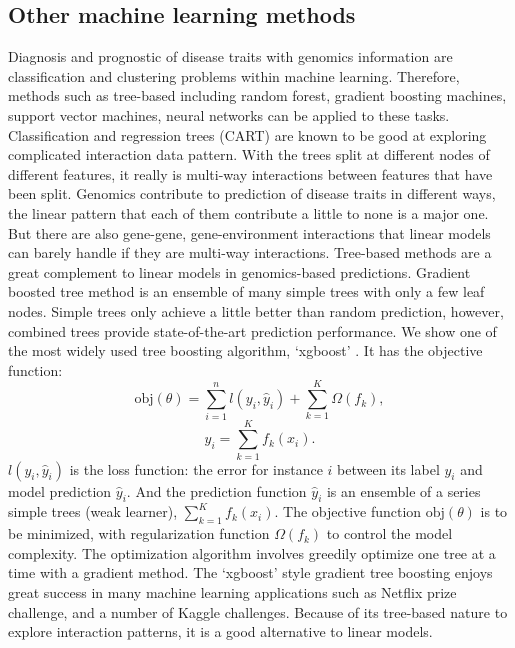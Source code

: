 \subsection{Other machine learning methods}
\label{sec:tree}
Diagnosis and prognostic of disease traits with genomics information are classification and clustering problems within machine learning. Therefore, methods such as tree-based including random forest, gradient boosting machines, support vector machines, neural networks can be applied to these tasks. Classification and regression trees (CART) are known to be good at exploring complicated interaction data pattern. With the trees split at different nodes of different features, it really is multi-way interactions between features that have been split. Genomics contribute to prediction of disease traits in different ways, the linear pattern that each of them contribute a little to none is a major one. But there are also gene-gene, gene-environment interactions that linear models can barely handle if they are multi-way interactions. Tree-based methods are a great complement to linear models in genomics-based predictions. Gradient boosted tree method is an ensemble of many simple trees with only a few leaf nodes. Simple trees only achieve a little better than random prediction, however, combined trees provide state-of-the-art prediction performance. We show one of the most widely used tree boosting algorithm, `xgboost' \citep{chen2016xgboost}. It has the objective function:
\begin{displaymath}
\text{obj}(\theta) = \sum_{i=1}^n l(y_i, \hat{y}_i) + \sum_{k=1}^K \Omega(f_k), 
\end{displaymath}
\begin{displaymath}
\hat{y}_i = \sum_{k=1}^Kf_k(x_i).
\end{displaymath}
$l(y_i, \hat{y}_i)$ is the loss function: the error for instance $i$ between its label $y_i$ and model prediction $\hat{y}_i$. And the prediction function $\hat{y}_i$ is an ensemble of a series simple trees (weak learner), $\sum_{k=1}^Kf_k(x_i)$. The objective function $\text{obj}(\theta)$ is to be minimized, with regularization function $\Omega(f_k)$ to control the model complexity. The optimization algorithm involves greedily optimize one tree at a time with a gradient method. The `xgboost' style gradient tree boosting enjoys great success in many machine learning applications such as Netflix prize challenge, and a number of Kaggle challenges. Because of its tree-based nature to explore interaction patterns, it is a good alternative to linear models.

